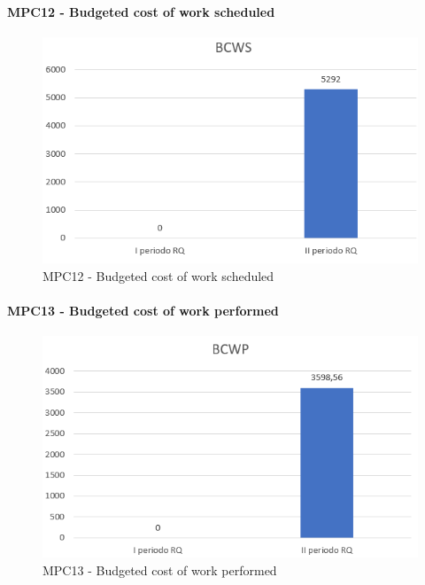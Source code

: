   
  \clearpage
  \paragraph{MPC12 - Budgeted cost of work scheduled}
  \begin{figure}[h!]
    \centering
      \includegraphics[scale=1]{Immagini/BCWS.PNG}
    \caption{MPC12 - Budgeted cost of work scheduled}
  \end{figure}


  \paragraph{MPC13 - Budgeted cost of work performed}
  \begin{figure}[h!]
    \centering
      \includegraphics[scale=1]{Immagini/BCWP.PNG}
    \caption{MPC13 - Budgeted cost of work performed}
  \end{figure}



  \clearpage
